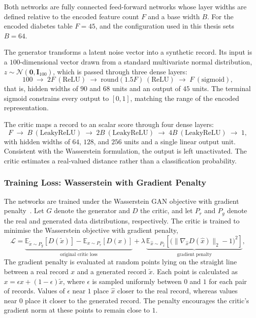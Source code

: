 Both networks are fully connected feed-forward networks whose layer widths
are defined relative to the encoded feature count $F$ and a base width $B$.
For the encoded diabetes table $F = 45$, and the configuration used in this
thesis sets $B = 64$.

The generator transforms a latent noise vector into a synthetic record. Its
input is a $100$-dimensional vector drawn from a standard multivariate normal
distribution, $z \sim \mathcal{N}(\mathbf{0}, \mathbf{I}_{100})$, which is
passed through three dense layers:
\begin{equation}
  100 \;\to\; 2F~(\mathrm{ReLU}) \;\to\;
  \mathrm{round}(1.5F)~(\mathrm{ReLU}) \;\to\; F~(\mathrm{sigmoid}),
\end{equation}
that is, hidden widths of $90$ and $68$ units and an output of $45$ units.
The terminal sigmoid constrains every output to $[0,1]$, matching the range
of the encoded representation.

The critic maps a record to an scalar score through four dense
layers:
\begin{equation}
  F \;\to\; B~(\mathrm{LeakyReLU}) \;\to\; 2B~(\mathrm{LeakyReLU})
  \;\to\; 4B~(\mathrm{LeakyReLU}) \;\to\; 1,
\end{equation}
with hidden widths of $64$, $128$, and $256$ units and a single linear output
unit. Consistent with the Wasserstein formulation, the output is left
unactivated. The critic estimates a real-valued distance rather than a
classification probability.

\subsubsection{Training Loss: Wasserstein with Gradient Penalty}
\label{sec:methods:healthgan:loss}

The networks are trained under the Wasserstein GAN objective with gradient
penalty~\cite{Arjovsky2017WGAN, Gulrajani2017WGANGP}. Let $G$ denote the
generator and $D$ the critic, and let $P_r$ and $P_g$ denote the real and
generated data distributions, respectively. The critic is trained to
minimise the Wasserstein objective with gradient penalty,
\begin{equation}
  \mathcal{L} =
    \underbrace{\mathbb{E}_{\tilde{x}\sim P_g}\!\left[D(\tilde{x})\right]
      - \mathbb{E}_{x\sim P_r}\!\left[D(x)\right]}_{\text{original critic loss}}
    + \lambda\,
    \underbrace{\mathbb{E}_{\hat{x}\sim P_{\hat{x}}}\!\left[
      \bigl(\lVert \nabla_{\hat{x}} D(\hat{x}) \rVert_2 - 1\bigr)^2
    \right]}_{\text{gradient penalty}},
  \label{eq:methods:healthgan:wgangp}
\end{equation}
The gradient penalty is evaluated at random points lying on the straight
line between a real record $x$ and a generated record $\tilde{x}$. Each
point is calculated as
$\hat{x}=\epsilon x+(1-\epsilon)\tilde{x}$, where
$\epsilon$ is sampled uniformly between $0$ and $1$ for each pair of
records. Values of $\epsilon$ near $1$ place $\hat{x}$ closer to the real
record, whereas values near $0$ place it closer to the generated record.
The penalty encourages the critic's gradient norm at these points to remain
close to $1$.


